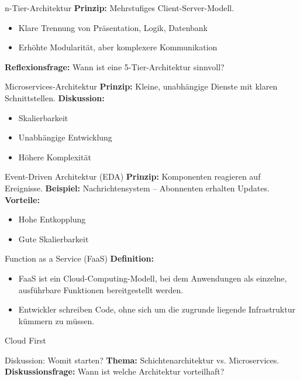 \documentclass{beamer}
\begin{document}
\begin{frame}{n-Tier-Architektur}
    \textbf{Prinzip:} Mehrstufiges Client-Server-Modell.
    \begin{itemize}
        \item Klare Trennung von Präsentation, Logik, Datenbank
        \item Erhöhte Modularität, aber komplexere Kommunikation
    \end{itemize}
    \textbf{Reflexionsfrage:} Wann ist eine 5-Tier-Architektur sinnvoll?
\end{frame}

\begin{frame}{Microservices-Architektur}
    \textbf{Prinzip:} Kleine, unabhängige Dienste mit klaren Schnittstellen.
    \textbf{Diskussion:}
    \begin{itemize}
        \item Skalierbarkeit
        \item Unabhängige Entwicklung
        \item Höhere Komplexität
    \end{itemize}
\end{frame}

\begin{frame}{Event-Driven Architektur (EDA)}
    \textbf{Prinzip:} Komponenten reagieren auf Ereignisse.
    \textbf{Beispiel:} Nachrichtensystem – Abonnenten erhalten Updates.
    \textbf{Vorteile:}
    \begin{itemize}
        \item Hohe Entkopplung
        \item Gute Skalierbarkeit
    \end{itemize}
\end{frame}

\begin{frame}{Function as a Service (FaaS)}
    \textbf{Definition:} 
    \begin{itemize}
        \item FaaS ist ein Cloud-Computing-Modell, bei dem Anwendungen als einzelne, ausführbare Funktionen bereitgestellt werden.
        \item Entwickler schreiben Code, ohne sich um die zugrunde liegende Infrastruktur kümmern zu müssen.
    \end{itemize}
    Cloud First
\end{frame}    

\begin{frame}{Diskussion: Womit starten?}
    \textbf{Thema:} Schichtenarchitektur vs. Microservices.
    \textbf{Diskussionsfrage:} Wann ist welche Architektur vorteilhaft?
\end{frame}
\end{document}
